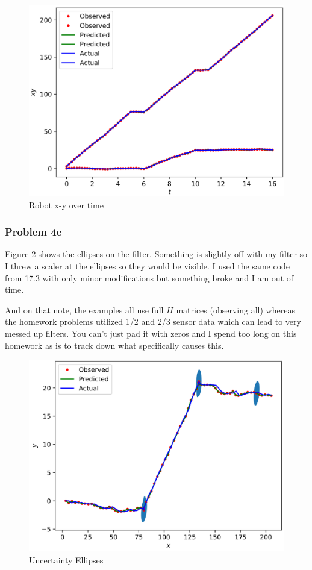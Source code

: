 \documentclass{article}
\begin{document}
\begin{figure}[h]
    \centering
    \includegraphics[scale=0.75]{problem17_4a_xy_t}
    \caption{Robot x-y over time}
    \label{fig:p17_4a_xyt}
\end{figure}

\subsubsection{Problem 4e}
Figure \ref{fig:p17_4a_ellipse} shows the ellipses on the filter. Something is 
slightly off with my filter so I threw a scaler at the ellipses so they would 
be visible. I used the same code from 17.3 with only minor modifications but 
something broke and I am out of time.

And on that note, the examples all use full $H$ matrices (observing all) whereas 
the homework problems utilized 1/2 and 2/3 sensor data which can lead to very 
messed up filters. You can't just pad it with zeros and I spend too long on 
this homework as is to track down what specifically causes this.

\begin{figure}[h]
    \centering
    \includegraphics[scale=0.75]{problem17_4a_ellipse}
    \caption{Uncertainty Ellipses}
    \label{fig:p17_4a_ellipse}
\end{figure}
\end{document}
